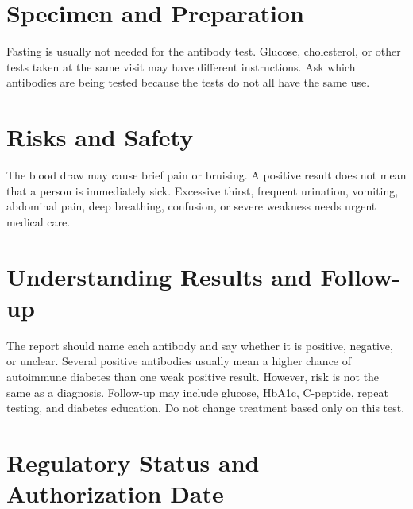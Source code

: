\section*{Specimen and Preparation}
Fasting is usually not needed for the antibody test. Glucose, cholesterol, or other tests taken at the same visit may have different instructions. Ask which antibodies are being tested because the tests do not all have the same use.

\section*{Risks and Safety}
The blood draw may cause brief pain or bruising. A positive result does not mean that a person is immediately sick. Excessive thirst, frequent urination, vomiting, abdominal pain, deep breathing, confusion, or severe weakness needs urgent medical care.

\section*{Understanding Results and Follow-up}
The report should name each antibody and say whether it is positive, negative, or unclear. Several positive antibodies usually mean a higher chance of autoimmune diabetes than one weak positive result. However, risk is not the same as a diagnosis. Follow-up may include glucose, HbA1c, C-peptide, repeat testing, and diabetes education. Do not change treatment based only on this test.

\section*{Regulatory Status and Authorization Date}

\clearpage
